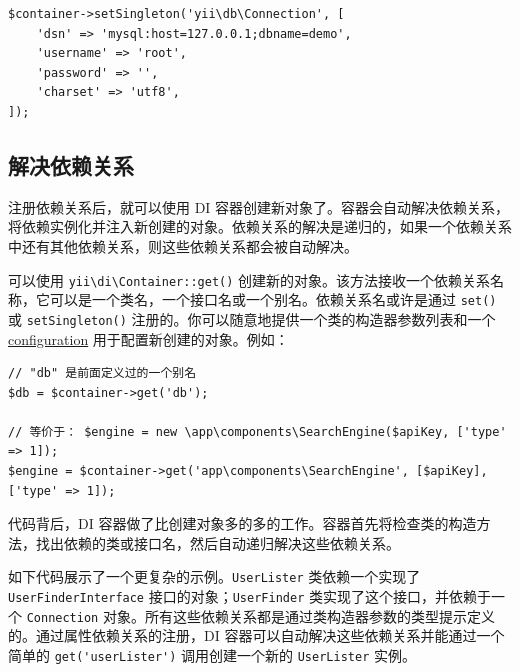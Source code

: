 \lstset{language=php}\begin{lstlisting}
$container->setSingleton('yii\db\Connection', [
    'dsn' => 'mysql:host=127.0.0.1;dbname=demo',
    'username' => 'root',
    'password' => '',
    'charset' => 'utf8',
]);
\end{lstlisting}
\subsection{解决依赖关系 \label{concept-di-container.md::resolving-dependencies}}
注册依赖关系后，就可以使用 DI 容器创建新对象了。容器会自动解决依赖关系，将依赖实例化并注入新创建的对象。依赖关系的解决是递归的，如果一个依赖关系中还有其他依赖关系，则这些依赖关系都会被自动解决。

可以使用 \texttt{yii{\allowbreak{}\textbackslash}di{\allowbreak{}\textbackslash}Container\allowbreak{}::\allowbreak{}get()} 创建新的对象。该方法接收一个依赖关系名称，它可以是一个类名，一个接口名或一个别名。依赖关系名或许是通过 \lstinline|set()| 或 \lstinline|setSingleton()| 注册的。你可以随意地提供一个类的构造器参数列表和一个\hyperref[concept-configurations.md]{configuration} 用于配置新创建的对象。例如：

\lstset{language=php}\begin{lstlisting}
// "db" 是前面定义过的一个别名
$db = $container->get('db');

// 等价于： $engine = new \app\components\SearchEngine($apiKey, ['type' => 1]);
$engine = $container->get('app\components\SearchEngine', [$apiKey], ['type' => 1]);
\end{lstlisting}
代码背后，DI 容器做了比创建对象多的多的工作。容器首先将检查类的构造方法，找出依赖的类或接口名，然后自动递归解决这些依赖关系。

如下代码展示了一个更复杂的示例。\lstinline|UserLister| 类依赖一个实现了 \lstinline|UserFinderInterface| 接口的对象；\lstinline|UserFinder| 类实现了这个接口，并依赖于一个 \lstinline|Connection| 对象。所有这些依赖关系都是通过类构造器参数的类型提示定义的。通过属性依赖关系的注册，DI 容器可以自动解决这些依赖关系并能通过一个简单的 \lstinline|get('userLister')| 调用创建一个新的 \lstinline|UserLister| 实例。

